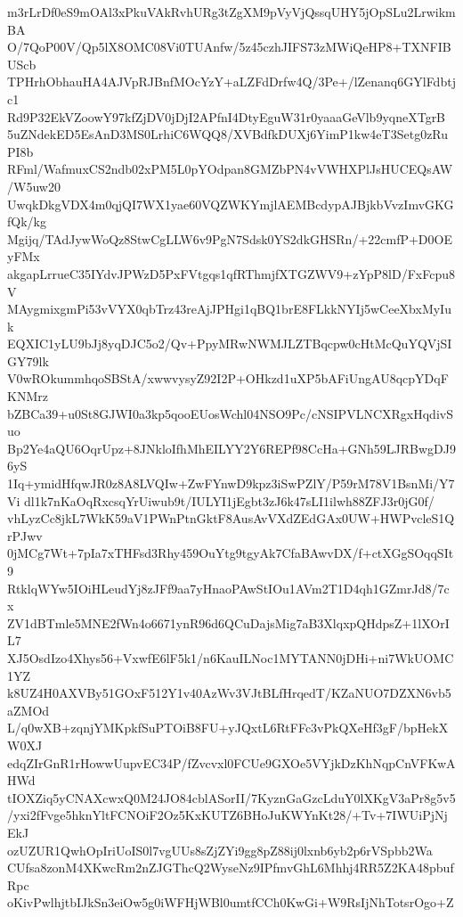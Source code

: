 m3rLrDf0eS9mOAl3xPkuVAkRvhURg3tZgXM9pVyVjQssqUHY5jOpSLu2LrwikmBA
O/7QoP00V/Qp5lX8OMC08Vi0TUAnfw/5z45czhJIFS73zMWiQeHP8+TXNFIBUScb
TPHrhObhauHA4AJVpRJBnfMOcYzY+aLZFdDrfw4Q/3Pe+/lZenanq6GYlFdbtjc1
Rd9P32EkVZoowY97kfZjDV0jDjI2APfnI4DtyEguW31r0yaaaGeVlb9yqneXTgrB
5uZNdekED5EsAnD3MS0LrhiC6WQQ8/XVBdfkDUXj6YimP1kw4eT3Setg0zRuPI8b
RFml/WafmuxCS2ndb02xPM5L0pYOdpan8GMZbPN4vVWHXPlJsHUCEQsAW/W5uw20
UwqkDkgVDX4m0qjQI7WX1yae60VQZWKYmjlAEMBcdypAJBjkbVvzImvGKGfQk/kg
Mgijq/TAdJywWoQz8StwCgLLW6v9PgN7Sdsk0YS2dkGHSRn/+22cmfP+D0OEyFMx
akgapLrrueC35IYdvJPWzD5PxFVtgqs1qfRThmjfXTGZWV9+zYpP8lD/FxFcpu8V
MAygmixgmPi53vVYX0qbTrz43reAjJPHgi1qBQ1brE8FLkkNYIj5wCeeXbxMyIuk
EQXIC1yLU9bJj8yqDJC5o2/Qv+PpyMRwNWMJLZTBqcpw0cHtMcQuYQVjSIGY79lk
V0wROkummhqoSBStA/xwwvysyZ92I2P+OHkzd1uXP5bAFiUngAU8qcpYDqFKNMrz
bZBCa39+u0St8GJWI0a3kp5qooEUosWchl04NSO9Pc/cNSIPVLNCXRgxHqdivSuo
Bp2Ye4aQU6OqrUpz+8JNkloIfhMhEILYY2Y6REPf98CcHa+GNh59LJRBwgDJ96yS
1Iq+ymidHfqwJR0z8A8LVQIw+ZwFYnwD9kpz3iSwPZlY/P59rM78V1BsnMi/Y7Vi
dl1k7nKaOqRxcsqYrUiwub9t/IULYI1jEgbt3zJ6k47sLI1ilwh88ZFJ3r0jG0f/
vhLyzCc8jkL7WkK59aV1PWnPtnGktF8AusAvVXdZEdGAx0UW+HWPvcleS1QrPJwv
0jMCg7Wt+7pIa7xTHFsd3Rhy459OuYtg9tgyAk7CfaBAwvDX/f+ctXGgSOqqSIt9
RtklqWYw5IOiHLeudYj8zJFf9aa7yHnaoPAwStIOu1AVm2T1D4qh1GZmrJd8/7cx
ZV1dBTmle5MNE2fWn4o6671ynR96d6QCuDajsMig7aB3XlqxpQHdpsZ+1lXOrIL7
XJ5OsdIzo4Xhys56+VxwfE6lF5k1/n6KauILNoc1MYTANN0jDHi+ni7WkUOMC1YZ
k8UZ4H0AXVBy51GOxF512Y1v40AzWv3VJtBLfHrqedT/KZaNUO7DZXN6vb5aZMOd
L/q0wXB+zqnjYMKpkfSuPTOiB8FU+yJQxtL6RtFFc3vPkQXeHf3gF/bpHekXW0XJ
edqZIrGnR1rHowwUupvEC34P/fZvcvxl0FCUe9GXOe5VYjkDzKhNqpCnVFKwAHWd
tIOXZiq5yCNAXcwxQ0M24JO84cblASorII/7KyznGaGzcLduY0lXKgV3aPr8g5v5
/yxi2fFvge5hknYltFCNOiF2Oz5KxKUTZ6BHoJuKWYnKt28/+Tv+7IWUiPjNjEkJ
ozUZUR1QwhOpIriUoIS0l7vgUUs8sZjZYi9gg8pZ88ij0lxnb6yb2p6rVSpbb2Wa
CUfsa8zonM4XKwcRm2nZJGThcQ2WyseNz9IPfmvGhL6Mhhj4RR5Z2KA48pbufRpc
oKivPwlhjtbIJkSn3eiOw5g0iWFHjWBl0umtfCCh0KwGi+W9RsIjNhTotsrOgo+Z
